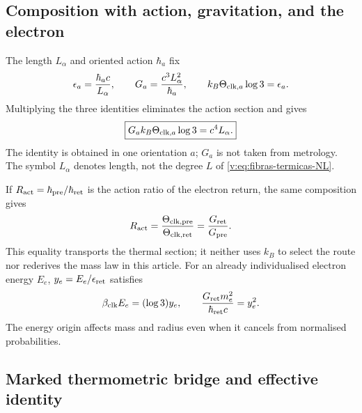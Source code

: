 \subsection{Composition with action, gravitation, and the electron}

The length $L_\alpha$ and oriented action $\hbar_a$ fix
\begin{equation}
 \epsilon_a=\frac{\hbar_ac}{L_\alpha},\qquad
 G_a=\frac{c^3L_\alpha^2}{\hbar_a},\qquad
 k_B\Theta_{{\rm clk},a}\log3=\epsilon_a.
 \label{v:eq:triple-accion-gravedad-temperatura}
\end{equation}
Multiplying the three identities eliminates the action section and gives
\begin{equation}
 \boxed{G_a k_B\Theta_{{\rm clk},a}\log3=c^4L_\alpha.}
 \label{v:eq:identidad-gravedad-temperatura}
\end{equation}
The identity is obtained in one orientation $a$; $G_a$ is not taken from
metrology. The symbol $L_\alpha$ denotes length, not the degree $L$ of
\eqref{v:eq:fibras-termicas-NL}.

If $R_{\rm act}=\hbar_{\rm pre}/\hbar_{\rm ret}$ is the action ratio of the
electron return, the same composition gives
\begin{equation}
 R_{\rm act}
 =\frac{\Theta_{{\rm clk,pre}}}{\Theta_{{\rm clk,ret}}}
 =\frac{G_{\rm ret}}{G_{\rm pre}}.
 \label{v:eq:retorno-accion-termico-gravitatorio}
\end{equation}
This equality transports the thermal section; it neither uses $k_B$ to
select the route nor rederives the mass law in this article. For an already
individualised electron energy $E_e$, $y_e=E_e/\epsilon_{\rm ret}$ satisfies
\[
 \beta_{\rm clk}E_e=(\log3)y_e,\qquad
 \frac{G_{\rm ret}m_e^2}{\hbar_{\rm ret}c}=y_e^2.
\]
The energy origin affects mass and radius even when it cancels from
normalised probabilities.

\subsection{Marked thermometric bridge and effective identity}


